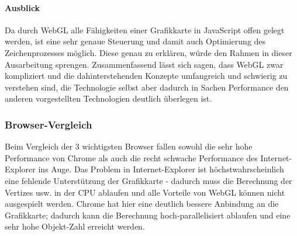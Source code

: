 \documentclass[a4paper, 12pt]{article}
\begin{document}
\paragraph{Ausblick} Da durch WebGL alle Fähigkeiten einer Grafikkarte in JavaScript offen gelegt werden, ist eine sehr genaue Steuerung und damit auch Optimierung des Zeichenprozesses möglich. Diese genau zu erklären, würde den Rahmen in dieser Ausarbeitung sprengen. Zusammenfassend lässt sich sagen, dass WebGL zwar kompliziert und die dahinterstehenden Konzepte umfangreich und schwierig zu verstehen sind, die Technologie selbst aber dadurch in Sachen Performance den anderen vorgestellten Technologien deutlich überlegen ist.
\newpage
\subsubsection{Browser-Vergleich} Beim Vergleich der 3 wichtigsten Browser fallen sowohl die sehr hohe Performance von Chrome als auch die recht schwache Performance des Internet-Explorer ins Auge. Das Problem in Internet-Explorer ist höchstwahrscheinlich eine fehlende Unterstützung der Grafikkarte - dadurch muss die Berechnung der Vertizes usw. in der CPU ablaufen und alle Vorteile von WebGL können nicht ausgespielt werden. Chrome hat hier eine deutlich bessere Anbindung an die Grafikkarte; dadurch kann die Berechnung hoch-parallelisiert ablaufen und eine sehr hohe Objekt-Zahl erreicht werden.\cite{WebGLBrowser}
\end{document}
